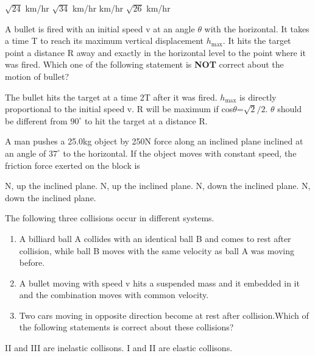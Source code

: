 \documentclass[12pt,addpoints]{exam}
\begin{document}
\begin{questions}
		\begin{oneparchoices}
			$\sqrt{24}$ km/hr
			$\sqrt{34}$ km/hr
			 km/hr
			$\sqrt{26}$ km/hr
		\end{oneparchoices}
		\question A bullet is fired with an initial speed v at an angle $\theta$ with the horizontal. It takes a time T to reach its maximum vertical displacement $h_\text{max}$. It hits the target point a distance R away and exactly in the horizontal level to the point where it was fired. Which one of the following statement is \textbf{NOT} correct about the motion of bullet?  \\ 
		\begin{choices}
			\choice The bullet hits the target at a time 2T after it was fired.
			\choice $h_\text{max}$ is directly proportional to the initial speed v.
			\choice R will be maximum if cos$\theta$=$\sqrt{2}/2$.
			\choice $\theta$ should be different from $90^{\circ}$ to hit the target at a distance R.
		\end{choices}
		\question A man pushes a 25.0kg object by 250N force along an inclined plane inclined at an angle of $37^{\circ}$ to the horizontal. If the object moves with constant speed, the friction force exerted on the block is  \\ 
		\begin{choices}
			 N, up the inclined plane.
			 N, up the inclined plane.
			 N, down the inclined plane.
			 N, down the inclined plane.
		\end{choices}
		\question The following three collisions occur in different systems. \newline
		\begin{enumerate}[label=\Roman*]
			\item A billiard ball A collides with an identical ball B and comes to rest after collision, while ball B moves with the same velocity as ball A was moving before.
			\item A bullet moving with speed v hits a suspended mass and it embedded in it and the combination moves with common velocity.
			\item Two cars moving in opposite direction become at rest after collision.\newline Which of the following statements is correct about these collisions?
		\end{enumerate}
		\begin{choices}
			\choice II and III are inelastic collisons.
			\choice I and II are elastic collisons.

\end{choices}
\end{questions}
\end{document}
